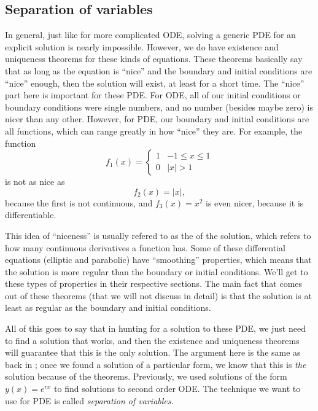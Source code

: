 \documentclass{ximera}
\begin{document}
\subsection{Separation of variables}

In general, just like for more complicated ODE, solving a generic PDE for an explicit solution is nearly impossible. However, we do have existence and uniqueness theorems for these kinds of equations. These theorems basically say that as long as the equation is ``nice'' and the boundary and initial conditions are ``nice'' enough, then the solution will exist, at least for a short time. The ``nice'' part here is important for these PDE. For ODE, all of our initial conditions or boundary conditions were single numbers, and no number (besides maybe zero) is nicer than any other. However, for PDE, our boundary and initial conditions are all functions, which can range greatly in how ``nice'' they are. For example, the function
\[ 
    f_1(x) = 
    \begin{cases} 
        1 & -1 \leq x \leq 1 \\ 
        0 & |x| > 1 
    \end{cases} 
\] 
is not as nice as
\[ 
    f_2(x) = |x|, 
\] 
because the first is not continuous, and $f_3(x) = x^2$ is even nicer, because it is differentiable. 

This idea of ``niceness'' is usually refered to as the \emph{} of the solution, which refers to how many continuous derivatives a function has. Some of these differential equations (elliptic and parabolic) have ``smoothing'' properties, which means that the solution is more regular than the boundary or initial conditions. We'll get to these types of properties in their respective sections. The main fact that comes out of these theorems (that we will not discuss in detail) is that the solution is at least as regular as the boundary and initial conditions.

All of this goes to say that in hunting for a solution to these PDE, we just need to find a solution that works, and then the existence and uniqueness theorems will guarantee that this is the only solution. The argument here is the same as back in ; once we found a solution of a particular form, we know that this is \emph{the} solution because of the theorems. Previously, we used solutions of the form $y(x) = e^{rx}$ to find solutions to second order ODE. The technique we want to use for PDE is called \emph{separation of variables}. 
\end{document}
